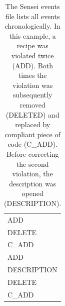 \begin{table}
    \centering
    \begin{tabular}{|l|}
      \hline
      \cellcolor{scw-orange!30}
      ADD\\
      \cellcolor{scw-teal!30}
      DELETE\\
      C\_ADD\\
      \cellcolor{scw-orange!30}
      ADD\\
      DESCRIPTION\\
      \cellcolor{scw-teal!30}
      DELETE\\
      C\_ADD\\
      \hline
    \end{tabular}
    \caption[Sensei events file]{The Sensei events file lists all events chronologically. In this example, a recipe was violated twice (ADD). Both times the violation was subsequently removed (DELETED) and replaced by compliant piece of code (C\_ADD). Before correcting the second violation, the description was opened (DESCRIPTION).}
    \label{tab:recipe1}
\end{table}

